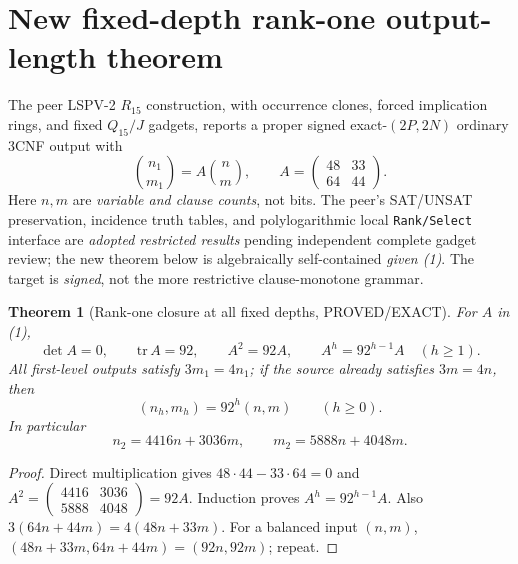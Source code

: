 \documentclass[11pt]{article}
\newtheorem{theorem}{Theorem}[section]
\begin{document}
\section{New fixed-depth rank-one output-length theorem}
The peer LSPV-2 $R_{15}$ construction, with occurrence clones, forced implication rings, and fixed $Q_{15}/J$ gadgets, reports a proper signed exact-$(2P,2N)$ ordinary 3CNF output with
\[
\binom{n_1}{m_1}=
A\binom nm,\qquad A=\begin{pmatrix}48&33\\64&44\end{pmatrix}.
\tag{1}
\]
Here $n,m$ are \emph{variable and clause counts}, not bits. The peer's SAT/UNSAT preservation, incidence truth tables, and polylogarithmic local \texttt{Rank/Select} interface are \emph{adopted restricted results} pending independent complete gadget review; the new theorem below is algebraically self-contained \emph{given (1)}. The target is \emph{signed}, not the more restrictive clause-monotone grammar.

\begin{theorem}[Rank-one closure at all fixed depths, PROVED/EXACT]
For $A$ in (1),
\[
\det A=0,\qquad \mathrm{tr}\,A=92,\qquad
A^2=92A,\qquad A^h=92^{h-1}A\quad(h\ge1).
\]
All first-level outputs satisfy $3m_1=4n_1$; if the source already satisfies $3m=4n$, then
\[
(n_h,m_h)=92^h(n,m)\qquad(h\ge0).
\]
In particular
\[
\boxed{n_2=4416n+3036m,\qquad m_2=5888n+4048m.}
\tag{2}
\]
\end{theorem}
\begin{proof}
Direct multiplication gives $48\cdot44-33\cdot64=0$ and
$A^2=\left(\begin{smallmatrix}4416&3036\\5888&4048\end{smallmatrix}\right)=92A$.
Induction proves $A^h=92^{h-1}A$. Also
$3(64n+44m)=4(48n+33m)$. For a balanced input $(n,m)$,
$(48n+33m,64n+44m)=(92n,92m)$; repeat.
\end{proof}
\end{document}
